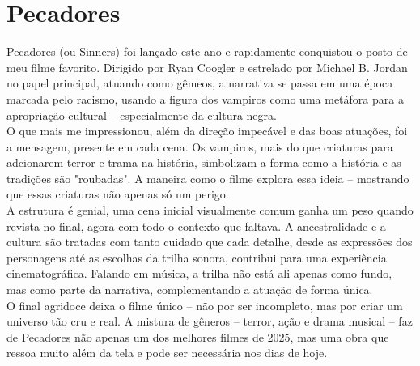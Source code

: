 \documentclass[
    12pt,                  %
    openright,             %
    oneside,               %
    a4paper,               %
    chapter=TITLE,         %
    section=TITLE,         %
    brazil                 %
]{abntex2}                 %
\begin{document}
\chapter*{Pecadores}
Pecadores (ou Sinners) foi lançado este ano e rapidamente conquistou o posto de meu filme favorito. Dirigido por Ryan Coogler e estrelado por Michael B. Jordan no papel principal, atuando como gêmeos, a narrativa se passa em uma época marcada pelo racismo, usando a figura dos vampiros como uma metáfora para a apropriação cultural – especialmente da cultura negra. \\ 
\vspace{13px}
\noindent O que mais me impressionou, além da direção impecável e das  boas atuações, foi a mensagem, presente em cada cena. Os vampiros, mais do que criaturas para adcionarem terror e trama na história, simbolizam a forma como a história e as tradições são "roubadas". A maneira como o filme explora essa ideia – mostrando que essas criaturas não apenas só um perigo. \\ 
\vspace{13px}
\noindent A estrutura é genial, uma cena inicial visualmente comum ganha um peso quando revista no final, agora com todo o contexto que faltava. A ancestralidade e a cultura são tratadas com tanto cuidado que cada detalhe, desde as expressões dos personagens até as escolhas da trilha sonora, contribui para uma experiência cinematográfica. Falando em música, a trilha não está ali apenas como fundo, mas como parte da narrativa, complementando a atuação de forma única. \\ 
\vspace{13px}
\noindent O final agridoce deixa o filme único – não por ser incompleto, mas por criar um universo tão cru e real. A mistura de gêneros – terror, ação e drama musical – faz de Pecadores não apenas um dos melhores filmes de 2025, mas uma obra que ressoa muito além da tela e pode ser necessária nos dias de hoje.
\end{document}
